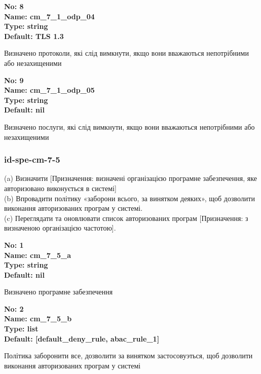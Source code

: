 \documentclass{article}
\begin{document}
{\footnotesize\bfseries
No: 8\\
Name: cm\_\allowbreak{}7\_\allowbreak{}1\_\allowbreak{}odp\_\allowbreak{}04\\
Type: string\\
Default: \textquotedbl{}TLS 1.3\textquotedbl{}
}

{\footnotesize Визначено протоколи, які слід вимкнути, якщо вони вважаються непотрібними або незахищеними}


{\footnotesize\bfseries
No: 9\\
Name: cm\_\allowbreak{}7\_\allowbreak{}1\_\allowbreak{}odp\_\allowbreak{}05\\
Type: string\\
Default: nil
}

{\footnotesize Визначено послуги, які слід вимкнути, якщо вони вважаються непотрібними або незахищеними}




\subsubsection{id-spe-cm-7-5}
(a) Визначити [Призначення: визначені організацією програмне забезпечення, яке авторизовано виконується в системі]\\ 
(b) Впровадити політику «заборони всього, за винятком деяких», щоб дозволити виконання авторизованих програм у системі.\\ 
(c) Переглядати та оновлювати список авторизованих програм [Призначення: з визначеною організацією частотою].

\vspace{10pt}
{\footnotesize\bfseries
No: 1\\
Name: cm\_\allowbreak{}7\_\allowbreak{}5\_\allowbreak{}a\\
Type: string\\
Default: nil
}

{\footnotesize Визначено програмне забезпечення}


{\footnotesize\bfseries
No: 2\\
Name: cm\_\allowbreak{}7\_\allowbreak{}5\_\allowbreak{}b\\
Type: list\\
Default: [\textquotedbl{}default\_\allowbreak{}deny\_\allowbreak{}rule\textquotedbl{}, \textquotedbl{}abac\_\allowbreak{}rule\_\allowbreak{}1\textquotedbl{}]
}

{\footnotesize Політика \textquotedbl{}заборонити все, дозволити за винятком\textquotedbl{} застосовуэться, щоб дозволити виконання авторизованих програм у системі}
\end{document}
